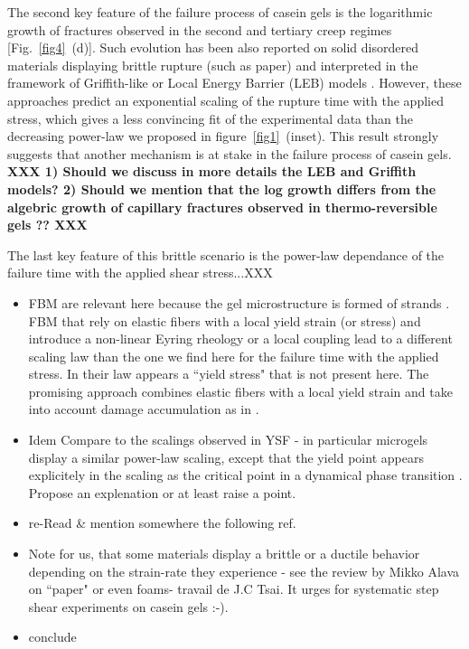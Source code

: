 \documentclass[twocolumn,superscriptaddress,showpacs,preprintnumbers,amsmath,amssymb,prl]{revtex4}
\newcommand{\ti}[1]{\textbf{\color{blue}#1}} %
\begin{document}
The second key feature of the failure process of casein gels is the logarithmic growth of fractures observed in the second and tertiary creep regimes [Fig.~\ref{fig4}~(d)]. Such evolution  has been also reported on solid disordered materials displaying brittle rupture (such as paper) and interpreted in the framework of Griffith-like or Local Energy Barrier (LEB) models \cite{Vanel:2009}. However, these approaches predict an exponential scaling of the rupture time with the applied stress, which gives a less convincing fit of the experimental data than the decreasing power-law we proposed in figure~\ref{fig1}~(inset). This result strongly suggests that another mechanism is at stake in the failure process of casein gels.
\ti{XXX 1) Should we discuss in more details the LEB and Griffith models? 2) Should we mention that the log growth differs from the algebric growth of capillary fractures observed in thermo-reversible gels \cite{Daniels:2007} ?? XXX}

The last key feature of this brittle scenario is the power-law dependance of the failure time with the applied shear stress...XXX

\begin{itemize}
\item FBM are relevant here because the gel microstructure is formed of strands \cite{Kalab:1983,Roefs:1990}. FBM that rely on elastic fibers with a local yield strain (or stress) and introduce a non-linear Eyring rheology or a local coupling lead to a different scaling law than the one we find here for the failure time with the applied stress. In their law appears a ``yield stress" \cite{Kun:2003,Nechad:2005,Kovacs:2008,Jagla:2011} that is not present here. The promising approach combines elastic fibers with a local yield strain and take into account damage accumulation as in \cite{Kun:2007,Halasz:2012}. 
\item Idem Compare to the scalings observed in YSF - in particular microgels display a similar power-law scaling, except that the yield point appears explicitely in the scaling as the critical point in a dynamical phase transition \cite{Divoux:2012}. Propose an explenation or at least raise a point.
\item re-Read \& mention somewhere the following ref. \cite{Chaudhuri:2013} 
\item Note for us, that some materials display a brittle or a ductile behavior depending on the strain-rate they experience - see the review by Mikko Alava on ``paper" or even foams- travail de J.C Tsai. It urges for systematic step shear experiments on casein gels :-).
\item conclude   
\end{itemize}
\end{document}
